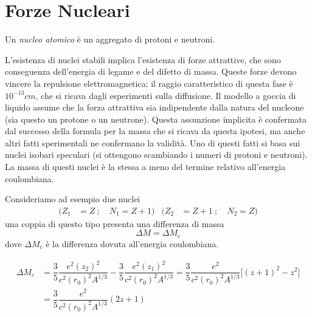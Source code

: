 \chapter{Forze Nucleari}

Un   \textit{nucleo atomico} è un aggregato di protoni 
e neutroni.

L'esistenza di nuclei stabili implica l'esistenza di forze attrattive, che sono
conseguenza  dell'energia di legame e del difetto di massa. Queste forze devono
vincere la repulsione elettromagnetica; il raggio caratteristico di questa fase
è $10^{-13} cm$, che si ricava dagli esperimenti sulla diffusione. Il modello a
goccia di liquido assume che la forza attrattiva sia indipendente dalla natura
del nucleone (sia questo un protone o un neutrone). Questa assunzione implicita
è confermata dal successo della formula per la massa che si ricava da questa
ipotesi, ma anche altri fatti sperimentali ne confermano la validità. Uno di
questi fatti si basa sui nuclei isobari speculari (si ottengono scambiando i
numeri di protoni e neutroni). La massa di questi nuclei è la stessa a meno del
termine relativo all'energia coulombiana. 

Consideriamo ad esempio due nuclei
\begin{align*}
	( Z_{1}& = Z \ ;  \quad N_{1} = Z+1 ) &  ( Z_{2}& = Z+1 \ ;  \quad 
N_{2} = Z) 
\end{align*}
una coppia di questo tipo presenta una differenza di massa 
\begin{equation*}
	 \Delta M = \Delta M_{c} 
\end{equation*}
dove $\Delta M_{c}$ è la differenza dovuta all'energia coulombiana.

\begin{equation}
\begin{split}
	\Delta M_{c} &= \dfrac{3}{5} \dfrac{e^2 (z_{2})^2}{c^2(r_{0})^2 
A^{1/3}} - \dfrac{3}{5} \dfrac{e^2 				
(z_{1})^2}{c^2(r_{0})^2 A^{1/3}} = \dfrac{3}{5} \dfrac{e^2}{c^2(r_{0})^2 
A^{1/3}} 				\bigl[ (z+1)^2-z^2 \bigr ] \\
			&= \dfrac{3}{5} \dfrac{e^2}{c^2(r_{0})^2 A^{1/3}} (2z+1)
\end{split}
\end{equation}

